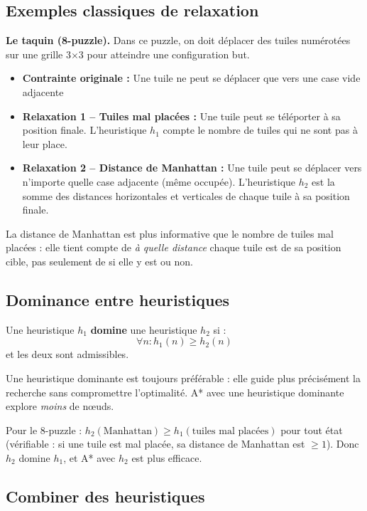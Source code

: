 \documentclass[11pt,a4paper]{article}
\begin{document}
\subsection{Exemples classiques de relaxation}

\textbf{Le taquin (8-puzzle).} Dans ce puzzle, on doit déplacer des tuiles numérotées sur une grille 3$\times$3 pour atteindre une configuration but.

\begin{itemize}
    \item \textbf{Contrainte originale :} Une tuile ne peut se déplacer que vers une case vide adjacente
    \item \textbf{Relaxation 1 -- Tuiles mal placées :} Une tuile peut se téléporter à sa position finale. L'heuristique $h_1$ compte le nombre de tuiles qui ne sont pas à leur place.
    \item \textbf{Relaxation 2 -- Distance de Manhattan :} Une tuile peut se déplacer vers n'importe quelle case adjacente (même occupée). L'heuristique $h_2$ est la somme des distances horizontales et verticales de chaque tuile à sa position finale.
\end{itemize}

La distance de Manhattan est plus informative que le nombre de tuiles mal placées : elle tient compte de \textit{à quelle distance} chaque tuile est de sa position cible, pas seulement de si elle y est ou non.

\subsection{Dominance entre heuristiques}

\begin{definitionbox}
Une heuristique $h_1$ \textbf{domine} une heuristique $h_2$ si :
$$\forall n : h_1(n) \geq h_2(n)$$
et les deux sont admissibles.
\end{definitionbox}

Une heuristique dominante est toujours préférable : elle guide plus précisément la recherche sans compromettre l'optimalité. A* avec une heuristique dominante explore \textit{moins} de nœuds.

Pour le 8-puzzle : $h_2(\text{Manhattan}) \geq h_1(\text{tuiles mal placées})$ pour tout état (vérifiable : si une tuile est mal placée, sa distance de Manhattan est $\geq 1$). Donc $h_2$ domine $h_1$, et A* avec $h_2$ est plus efficace.

\subsection{Combiner des heuristiques}
\end{document}
